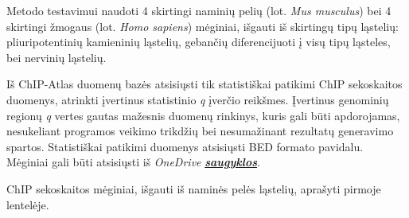 \documentclass[12pt]{article}
\begin{document}
Metodo testavimui naudoti 4 skirtingi naminių pelių (lot. \emph{Mus musculus})
bei 4 skirtingi žmogaus (lot. \emph{Homo sapiens}) mėginiai, išgauti iš
skirtingų tipų ląstelių: pliuripotentinių kamieninių ląstelių, gebančių
diferencijuoti į visų tipų ląsteles, bei nervinių ląstelių.

Iš ChIP-Atlas duomenų bazės atsisiųsti tik statistiškai patikimi ChIP
sekoskaitos duomenys, atrinkti įvertinus statistinio \emph{q} įverčio reikšmes.
Įvertinus genominių regionų \emph{q} vertes gautas mažesnis duomenų rinkinys,
kuris gali būti apdorojamas, nesukeliant programos veikimo trikdžių bei
nesumažinant rezultatų generavimo spartos. Statistiškai patikimi duomenys
atsisiųsti BED formato pavidalu. Mėginiai gali būti atsisiųsti iš
\emph{OneDrive} \href{https://vult-my.sharepoint.com/:f:/g/personal/daniele_stasiunaite_mif_stud_vu_lt/EtEGQ8POkapLhPv6eHvl48cB-jmes81M0JPW8PVWTz2QgA?e=wjSSKJ}{\emph{\textbf{saugyklos}}}.

ChIP sekoskaitos mėginiai, išgauti iš naminės pelės ląstelių, aprašyti pirmoje
lentelėje.
\end{document}
